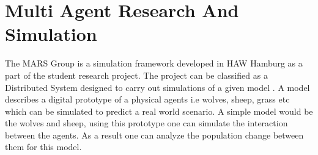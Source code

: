 
\section{Multi Agent Research And Simulation}
        \label{section:MARS}
        The MARS Group is a simulation framework developed 
        in HAW Hamburg as a  part of the student research project. The project can be classified as a
        Distributed System \cite{DistributedSystems} designed to carry out simulations of a given model 
        \cite{HAWHamburgMARS}. 
        A model describes a digital prototype of a physical agents i.e wolves, sheep, grass etc 
        which can be simulated to predict a real world scenario. A simple model would
        be the wolves and sheep, using this prototype one can simulate the interaction between the agents. 
        As a result one can analyze the population change between them for this model. 

